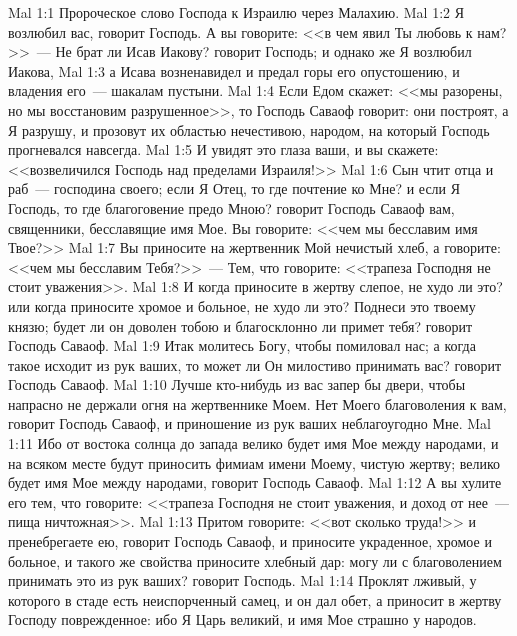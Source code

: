 \vs Mal 1:1 Пророческое слово Господа к Израилю через Малахию.
\rsbpar\vs Mal 1:2 Я возлюбил вас, говорит Господь. А вы говорите: <<в чем явил Ты любовь к нам?>>~--- Не брат ли Исав Иакову? говорит Господь; и однако же Я возлюбил Иакова,
\vs Mal 1:3 а Исава возненавидел и предал горы его опустошению, и владения его~--- шакалам пустыни.
\vs Mal 1:4 Если Едом скажет: <<мы разорены, но мы восстановим разрушенное>>, то Господь Саваоф говорит: они построят, а Я разрушу, и прозовут их областью нечестивою, народом, на который Господь прогневался навсегда.
\vs Mal 1:5 И увидят это глаза ваши, и вы скажете: <<возвеличился Господь над пределами Израиля!>>
\vs Mal 1:6 Сын чтит отца и раб~--- господина своего; если Я Отец, то где почтение ко Мне? и если Я Господь, то где благоговение предо Мною? говорит Господь Саваоф вам, священники, бесславящие имя Мое. Вы говорите: <<чем мы бесславим имя Твое?>>
\vs Mal 1:7 Вы приносите на жертвенник Мой нечистый хлеб, а говорите: <<чем мы бесславим Тебя?>>~--- Тем, что говорите: <<трапеза Господня не стоит уважения>>.
\vs Mal 1:8 И когда приносите в жертву слепое, не худо ли это? или когда приносите хромое и больное, не худо ли это? Поднеси это твоему князю; будет ли он доволен тобою и благосклонно ли примет тебя? говорит Господь Саваоф.
\vs Mal 1:9 Итак молитесь Богу, чтобы помиловал нас; а когда такое исходит из рук ваших, то может ли Он милостиво принимать вас? говорит Господь Саваоф.
\vs Mal 1:10 Лучше кто-нибудь из вас запер бы двери, чтобы напрасно не держали огня на жертвеннике Моем. Нет Моего благоволения к вам, говорит Господь Саваоф, и приношение из рук ваших неблагоугодно Мне.
\vs Mal 1:11 Ибо от востока солнца до запада велико будет имя Мое между народами, и на всяком месте будут приносить фимиам имени Моему, чистую жертву; велико будет имя Мое между народами, говорит Господь Саваоф.
\vs Mal 1:12 А вы хулите его тем, что говорите: <<трапеза Господня не стоит уважения, и доход от нее~--- пища ничтожная>>.
\vs Mal 1:13 Притом говорите: <<вот сколько труда!>> и пренебрегаете ею, говорит Господь Саваоф, и приносите украденное, хромое и больное, и такого же свойства приносите хлебный дар: могу ли с благоволением принимать это из рук ваших? говорит Господь.
\vs Mal 1:14 Проклят лживый, у которого в стаде есть неиспорченный самец, и он дал обет, а приносит в жертву Господу поврежденное: ибо Я Царь великий, и имя Мое страшно у народов.
